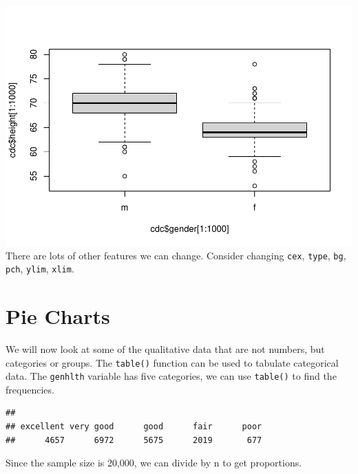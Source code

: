 \documentclass[
]{book}
\newenvironment{Shaded}{\begin{snugshade}}{\end{snugshade}}
\newcommand{\DecValTok}[1]{\textcolor[rgb]{0.00,0.00,0.81}{#1}}
\newcommand{\KeywordTok}[1]{\textcolor[rgb]{0.13,0.29,0.53}{\textbf{#1}}}
\newcommand{\NormalTok}[1]{#1}
\newcommand{\OperatorTok}[1]{\textcolor[rgb]{0.81,0.36,0.00}{\textbf{#1}}}
\begin{document}
\includegraphics{_main_files/figure-latex/unnamed-chunk-178-1.pdf}
There are lots of other features we can change. Consider changing \texttt{cex}, \texttt{type}, \texttt{bg}, \texttt{pch}, \texttt{ylim}, \texttt{xlim}.

\hypertarget{pie-charts}{%
\section{Pie Charts}\label{pie-charts}}

We will now look at some of the qualitative data that are not numbers, but categories or groups. The \texttt{table()} function can be used to tabulate categorical data. The \texttt{genhlth} variable has five categories, we can use \texttt{table()} to find the frequencies.

\begin{Shaded}
\end{Shaded}

\begin{verbatim}
## 
## excellent very good      good      fair      poor 
##      4657      6972      5675      2019       677
\end{verbatim}

Since the sample size is 20,000, we can divide by n to get proportions.

\begin{Shaded}
\end{Shaded}
\end{document}
